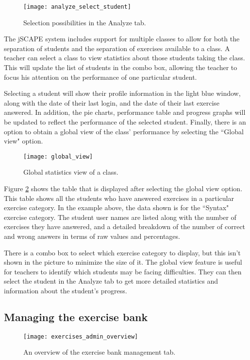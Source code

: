 \begin{figure}[H]
\centering
\texttt{[image: analyze\_select\_student]}
\caption{Selection possibilities in the Analyze tab.}
\label{fig:analyze_select_student}
\end{figure}

The jSCAPE system includes support for multiple classes to allow for both the separation of students and the separation of exercises available to a class. A teacher can select a class to view statistics about those students taking the class. This will update the list of students in the combo box, allowing the teacher to focus his attention on the performance of one particular student. \newline

Selecting a student will show their profile information in the light blue window, along with the date of their last login, and the date of their last exercise answered. In addition, the pie charts, performance table and progress graphs will be updated to reflect the performance of the selected student. Finally, there is an option to obtain a global view of the class' performance by selecting the ``Global view" option. 

\begin{figure}[H]
\centering
\texttt{[image: global\_view]}
\caption{Global statistics view of a class.}
\label{fig:global_view}
\end{figure}

Figure \ref{fig:global_view} shows the table that is displayed after selecting the global view option. This table shows all the students who have answered exercises in a particular exercise category. In the example above, the data shown is for the ``Syntax" exercise category. The student user names are listed along with the number of exercises they have answered, and a detailed breakdown of the number of correct and wrong answers in terms of raw values and percentages. \newline

There is a combo box to select which exercise category to display, but this isn't shown in the picture to minimize the size of it. The global view feature is useful for teachers to identify which students may be facing difficulties. They can then select the student in the Analyze tab to get more detailed statistics and information about the student's progress.

\subsection{Managing the exercise bank}
\begin{figure}[H]
\centering
\texttt{[image: exercises\_admin\_overview]}
\caption{An overview of the exercise bank management tab.}
\label{fig:exercises_admin_overview}
\end{figure}

